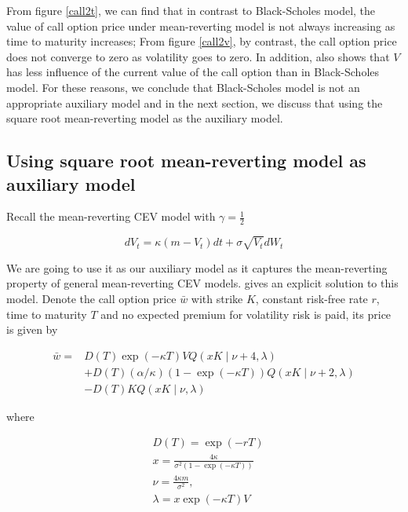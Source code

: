 From figure \ref{call2t}, we can find that in contrast to Black-Scholes model, the value of call option price under mean-reverting model is not always increasing as time to maturity increases; From figure \ref{call2v}, by contrast, the call option price does not converge to zero as volatility goes to zero. In addition, \cite{grunbichler_valuing_1996} also shows that $V$ has less influence of the current value of the call option than in Black-Scholes model. For these reasons, we conclude that Black-Scholes model is not an appropriate auxiliary model and in the next section, we discuss that using the square root mean-reverting model as the auxiliary model.

\subsection{Using square root mean-reverting model as auxiliary model}

Recall the mean-reverting CEV model with $\gamma=\frac{1}{2}$

\begin{equation}
    d V_t=\kappa(m - V_t) d t+\sigma \sqrt{V_t} d W_t
\end{equation}

We are going to use it as our auxiliary model as it captures the mean-reverting property of general mean-reverting CEV models. \cite{grunbichler_valuing_1996} gives an explicit solution to this model. Denote the call option price $\bar{w}$ with strike $K$, constant risk-free rate $r$, time to maturity $T$ and no expected premium for volatility risk is paid, its price is given by

\begin{equation}\label{aux call price}
    \begin{aligned}
        \bar{w}=& D(T) \exp (-\kappa T) V Q(x K \mid \nu+4, \lambda) \\
        &+D(T)(\alpha / \kappa)(1-\exp (-\kappa T)) Q(xK \mid \nu+2, \lambda) \\
        &-D(T) K Q(x K \mid \nu, \lambda)
        \end{aligned}
\end{equation}

\noindent where

$$
\begin{aligned}
    &D(T) = \exp(-rT)\\
    &x=\frac{4 \kappa}{\sigma^{2}(1-\exp (-\kappa T))} \\
    &\nu=\frac{4 \kappa m}{\sigma^{2}}, \\
    &\lambda=x \exp (-\kappa T) V
    \end{aligned}
$$

